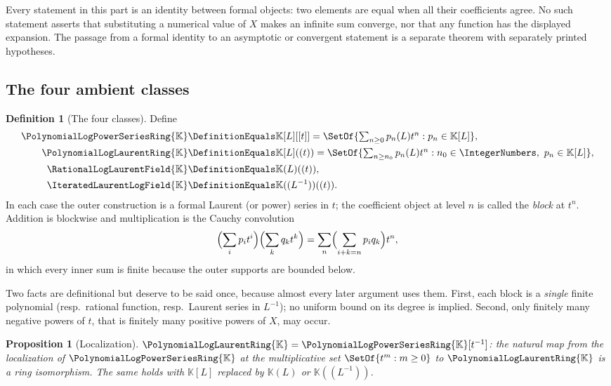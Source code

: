 \documentclass[11pt,oneside]{article}
\theoremstyle{plain}
\newtheorem{proposition}[theorem]{Proposition}
\theoremstyle{definition}
\newtheorem{definition}[theorem]{Definition}
\theoremstyle{remark}
\newcommand{\K}{\mathbb{K}}
\newcommand{\PLpow}{\PolynomialLogPowerSeriesRing{\K}}   %
\newcommand{\PLlau}{\PolynomialLogLaurentRing{\K}}       %
\newcommand{\PLrat}{\RationalLogLaurentField{\K}}        %
\newcommand{\PLit}{\IteratedLaurentLogField{\K}}         %
\begin{document}
\begin{warningbox}[title={Formal is not analytic}]
Every statement in this part is an identity between formal objects: two
elements are equal when all their coefficients agree.  No such statement
asserts that substituting a numerical value of \(X\) makes an infinite sum
converge, nor that any function has the displayed expansion.  The passage from
a formal identity to an asymptotic or convergent statement is a separate
theorem with separately printed hypotheses.
\end{warningbox}

\subsection{The four ambient classes}
\label{plt:sec:ring-four-classes}

\begin{definition}[The four classes]
\label{plt:def:ring-four-classes}
Define
\begin{align}
  \PLpow&\DefinitionEquals\K[L][[t]]
    =\SetOf{\textstyle\sum_{n\ge0}p_n(L)t^n:p_n\in\K[L]},
    \label{plt:eq:ring-PLpow}\\
  \PLlau&\DefinitionEquals\K[L]((t))
    =\SetOf{\textstyle\sum_{n\ge n_0}p_n(L)t^n:
      n_0\in\IntegerNumbers,\ p_n\in\K[L]},
    \label{plt:eq:ring-PLlau}\\
  \PLrat&\DefinitionEquals\K(L)((t)),
    \label{plt:eq:ring-PLrat}\\
  \PLit&\DefinitionEquals\K((L^{-1}))((t)).
    \label{plt:eq:ring-PLit}
\end{align}
In each case the outer construction is a formal Laurent (or power) series in
\(t\); the coefficient object at level \(n\) is called the \emph{block} at
\(t^n\).  Addition is blockwise and multiplication is the Cauchy convolution
\[
  \Bigl(\sum_i p_it^i\Bigr)\Bigl(\sum_k q_kt^k\Bigr)
  =\sum_n\Bigl(\sum_{i+k=n}p_iq_k\Bigr)t^n ,
\]
in which every inner sum is finite because the outer supports are bounded
below.
\end{definition}

Two facts are definitional but deserve to be said once, because almost every
later argument uses them.  First, each block is a \emph{single} finite
polynomial (resp.\ rational function, resp.\ Laurent series in \(L^{-1}\)); no
uniform bound on its degree is implied.  Second, only finitely many negative
powers of \(t\), that is finitely many positive powers of \(X\), may occur.

\begin{proposition}[Localization]
\label{plt:prop:ring-localization}
\(\PLlau=\PLpow[t^{-1}]\): the natural map from the localization of \(\PLpow\)
at the multiplicative set \(\SetOf{t^m:m\ge0}\) to \(\PLlau\) is a ring
isomorphism.  The same holds with \(\K[L]\) replaced by \(\K(L)\) or
\(\K((L^{-1}))\).
\end{proposition}
\end{document}
